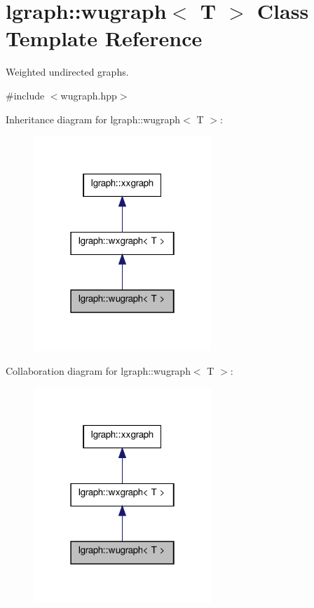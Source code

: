 \hypertarget{classlgraph_1_1wugraph}{\section{lgraph\-:\-:wugraph$<$ T $>$ Class Template Reference}
\label{classlgraph_1_1wugraph}
}


Weighted undirected graphs.  




{\ttfamily \#include $<$wugraph.\-hpp$>$}



Inheritance diagram for lgraph\-:\-:wugraph$<$ T $>$\-:
\nopagebreak
\begin{figure}[H]
\begin{center}
\leavevmode
\includegraphics[width=190pt]{classlgraph_1_1wugraph__inherit__graph}
\end{center}
\end{figure}


Collaboration diagram for lgraph\-:\-:wugraph$<$ T $>$\-:
\nopagebreak
\begin{figure}[H]
\begin{center}
\leavevmode
\includegraphics[width=190pt]{classlgraph_1_1wugraph__coll__graph}
\end{center}
\end{figure}

